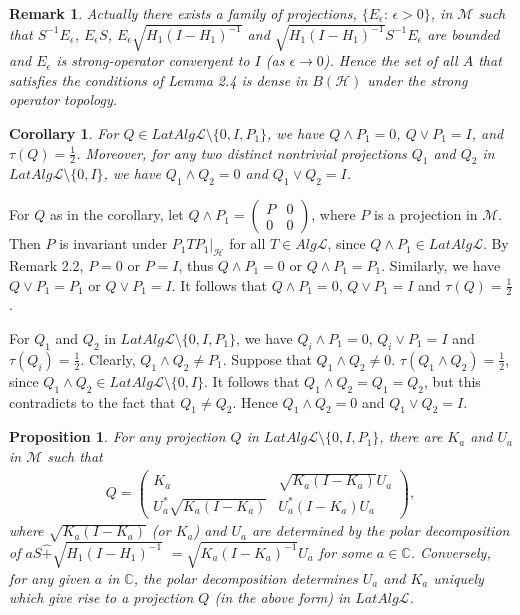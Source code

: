 \documentclass[12pt]{article}
\newtheorem{corollary}{Corollary}[section]
\newtheorem{prop}{Proposition}[section]
\newtheorem{remark}{Remark}[section]
\newcommand{\HHH}{\mathcal H} %
\newcommand{\LLL}{\mathcal L} %
\newcommand{\MMM}{\mathcal M}
\newcommand{\C}{\mathbb C} %
\def\L{{\mathcal{L}}}
\begin{document}
{\begin{remark}
Actually there exists a family of projections, $\{E_{\epsilon}:\,\epsilon>0\}$, in $\MMM$ such that $S^{-1}E_{\epsilon}$,
$E_{\epsilon}S$, $E_{\epsilon}\sqrt{H_{1}(I-H_{1})^{-1}}$ and
$\sqrt{H_{1}(I-H_{1})^{-1}}S^{-1}E_{\epsilon}$ are bounded and
$E_{\epsilon}$ is strong-operator convergent to $I$ (as
$\epsilon\rightarrow 0$). Hence the set of all $A$ that satisfies the conditions of Lemma 2.4 is dense in
$B(\HHH)$ under the strong operator topology.
\end{remark}

\begin{corollary} For $Q\in LatAlg\L \setminus \{0,I, P_1\}$,
 we have $Q\wedge P_1=0$, $Q\vee P_1=I$, and $\tau(Q)=\frac12$.
Moreover, for any two distinct nontrivial projections $Q_1$ and $Q_2$ in $LatAlg\L \setminus \{0, I \}$,
 we have $Q_1\wedge Q_2=0$ and $Q_1\vee Q_2=I$.
\end{corollary}


 \quad For $Q$ as in the corollary, let $Q\wedge P_1=\left(\begin{array}{cc} P & 0 \\ 0 &
0\end{array}\right)$, where $P$ is a projection in $\MMM$. Then $P$ is invariant under $P_1TP_1|_{\HHH}$ for all $T \in Alg\L$,
since $Q\wedge P_1 \in LatAlg\L$. By Remark 2.2, 
$P=0$ or $P=I$, thus $Q\wedge
P_1=0$ or $Q\wedge P_1=P_1$. Similarly, we have $Q\vee P_1=P_1$ or
$Q\vee P_1=I$. It follows that $Q\wedge P_1=0$, $Q\vee P_1=I$ and $\tau(Q)=\frac12$.

For $Q_1$ and $Q_2$ in $LatAlg\L \setminus \{0, I, P_1 \}$, we have 
$Q_i\wedge P_1=0$, $Q_i\vee P_1=I$ and $\tau(Q_i)=\frac12$.
Clearly, $Q_1\wedge Q_2\neq P_1$. Suppose that $Q_1\wedge Q_2\neq
0$. $\tau(Q_1\wedge Q_2)=\frac12$, since $Q_1\wedge Q_2 \in   LatAlg\L \setminus \{0,I\}$.  It follows that $Q_1\wedge
Q_2=Q_1=Q_2$, but this contradicts to the fact that $Q_1 \neq Q_2$. Hence $Q_1\wedge Q_2=0$ and
$Q_1\vee Q_2=I$. \vspace{2mm}



\begin{prop}
For any projection $Q$ in $LatAlg\LLL \setminus \{0, I, P_{1}\}$, there are $K_a$ and $U_a$ in $\MMM$ such that 
\begin{align*}
Q = \left(\begin{array}{cc}K_{a} & \sqrt{K_{a}(I-K_{a})}U_{a} \\U_{a}^{*}\sqrt{K_{a}(I-K_{a})} &
U_{a}^{*}(I-K_{a})U_{a} \end{array}\right),
\end{align*}
where $\sqrt{K_{a}(I-K_{a})}$ (or  $K_{a}$) and $U_{a}$ are determined
by the polar decomposition of $aS
\widehat{+} \sqrt{H_{1}(I-H_{1})^{-1}}$
$= \sqrt{K_{a}(I-K_{a})^{-1}} U_{a}$ for some $a \in \C$.
Conversely, for any given $a$ in $\C$, the polar decomposition
determines $U_{a}$ and $K_{a}$ uniquely which give rise to a projection $Q$ (in the
above form) in $LatAlg\LLL$.
\end{prop}


}
\end{document}
